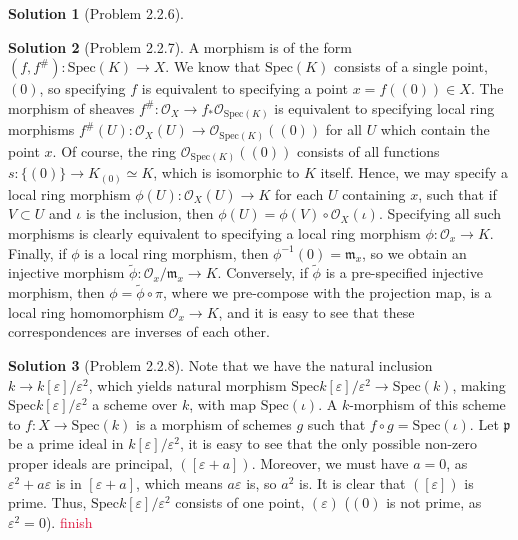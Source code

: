 \documentclass[aps,pra,showpacs,notitlepage,onecolumn,superscriptaddress,nofootinbib]{revtex4-1}
\newcommand{\pop}[1]{\textcolor{crimson}{#1}}
\theoremstyle{definition}
\newtheorem{solution}{Solution}[section]
\begin{document}
\begin{solution}[Problem 2.2.6]

  \end{solution}

\begin{solution}[Problem 2.2.7]
  A morphism is of the form $(f, f^{\#}) : \text{Spec}(K) \rightarrow X$. We know that $\text{Spec}(K)$ consists of a single point, $(0)$, so specifying $f$ is equivalent to specifying a point $x = f((0)) \in X$.
  The morphism of sheaves $f^{\#} : \mathcal{O}_X \rightarrow f_{*} \mathcal{O}_{\text{Spec}(K)}$ is equivalent to specifying local ring morphisms $f^{\#}(U) : \mathcal{O}_X(U) \rightarrow \mathcal{O}_{\text{Spec}(K)}((0))$
  for all $U$ which contain the point $x$. Of course, the ring $\mathcal{O}_{\text{Spec}(K)}((0))$ consists of all functions $s : \{(0)\} \rightarrow K_{(0)} \simeq K$, which is isomorphic to $K$ itself. Hence,
  we may specify a local ring morphism $\phi(U) : \mathcal{O}_X(U) \rightarrow K$ for each $U$ containing $x$, such that if $V \subset U$ and $\iota$ is the inclusion, then $\phi(U) = \phi(V) \circ \mathcal{O}_X(\iota)$.
  Specifying all such morphisms is clearly equivalent to specifying a local ring morphism $\phi : \mathcal{O}_{x} \rightarrow K$. Finally, if $\phi$ is a local ring morphism, then $\phi^{-1}(0) = \mathfrak{m}_x$, so
  we obtain an injective morphism $\widetilde{\phi} : \mathcal{O}_x/\mathfrak{m}_x \rightarrow K$. Conversely, if $\widetilde{\phi}$ is a pre-specified injective morphism, then $\phi = \widetilde{\phi} \circ \pi$,
  where we pre-compose with the projection map, is a local ring homomorphism $\mathcal{O}_x \rightarrow K$, and it is easy to see that these correspondences are inverses of each other.
  \end{solution}

\begin{solution}[Problem 2.2.8]
  Note that we have the natural inclusion $k \rightarrow k[\varepsilon]/\varepsilon^2$, which yields natural morphism $\text{Spec} k[\varepsilon]/\varepsilon^2 \rightarrow \text{Spec}(k)$, making
  $\text{Spec} k[\varepsilon]/\varepsilon^2$ a scheme over $k$, with map $\text{Spec}(\iota)$. A $k$-morphism of this scheme to $f : X \rightarrow \text{Spec}(k)$ is a morphism of schemes $g$ such that $f \circ g = \text{Spec}(\iota)$.
  Let $\mathfrak{p}$ be a prime ideal in $k[\varepsilon]/\varepsilon^2$, it is easy to see that the only possible non-zero
  proper ideals are principal, $([\varepsilon + a])$. Moreover, we must have $a = 0$, as $\varepsilon^2 + a \varepsilon$ is
  in $[\varepsilon + a]$, which means $a\varepsilon$ is, so $a^2$ is. It is clear that $([\varepsilon])$ is prime. Thus, $\text{Spec} k[\varepsilon]/\varepsilon^2$ consists of one point, $(\varepsilon)$
  ($(0)$ is not prime, as $\varepsilon^2 = 0$). \pop{finish}
  \end{solution}
\end{document}
